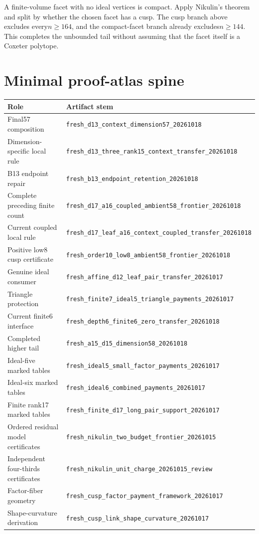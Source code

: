 \documentclass[11pt]{article}
\theoremstyle{remark}\newtheorem{remark}[theorem]{Remark}
\newcommand{\cert}[1]{\nolinkurl{#1}}
\begin{document}
A finite-volume facet with no ideal vertices is compact. Apply
Nikulin's theorem and split by whether the chosen facet has a
cusp. The cusp branch above excludes every$n\ge164$, and the
compact-facet branch already excludes$n\ge144$. This completes
the unbounded tail without assuming that the facet itself is
a Coxeter polytope.

\section{Minimal proof-atlas spine}
\small
\begin{longtable}{p{}p{}}
\toprule Role&Artifact stem\\\midrule
Final57 composition&\cert{fresh_d13_context_dimension57_20261018}\\
Dimension-specific local rule&\cert{fresh_d13_three_rank15_context_transfer_20261018}\\
B13 endpoint repair&\cert{fresh_b13_endpoint_retention_20261018}\\
Complete preceding finite count&\cert{fresh_d17_a16_coupled_ambient58_frontier_20261018}\\
Current coupled local rule&\cert{fresh_d17_leaf_a16_context_coupled_transfer_20261018}\\
Positive low8 cusp certificate&\cert{fresh_order10_low8_ambient58_frontier_20261018}\\
Genuine ideal consumer&\cert{fresh_affine_d12_leaf_pair_transfer_20261017}\\
Triangle protection&\cert{fresh_finite7_ideal5_triangle_payments_20261017}\\
Current finite6 interface&\cert{fresh_depth6_finite6_zero_transfer_20261018}\\
Completed higher tail&\cert{fresh_a15_d15_dimension58_20261018}\\
Ideal-five marked tables&\cert{fresh_ideal5_small_factor_payments_20261017}\\
Ideal-six marked tables&\cert{fresh_ideal6_combined_payments_20261017}\\
Finite rank17 marked tables&\cert{fresh_finite_d17_long_pair_support_20261017}\\
Ordered residual model certificates&\cert{fresh_nikulin_two_budget_frontier_20261015}\\
Independent four-thirds certificates&\cert{fresh_nikulin_unit_charge_20261015_review}\\
Factor-fiber geometry&\cert{fresh_cusp_factor_payment_framework_20261017}\\
Shape-curvature derivation&\cert{fresh_cusp_link_shape_curvature_20261017}\\\bottomrule
\end{longtable}
\end{document}
